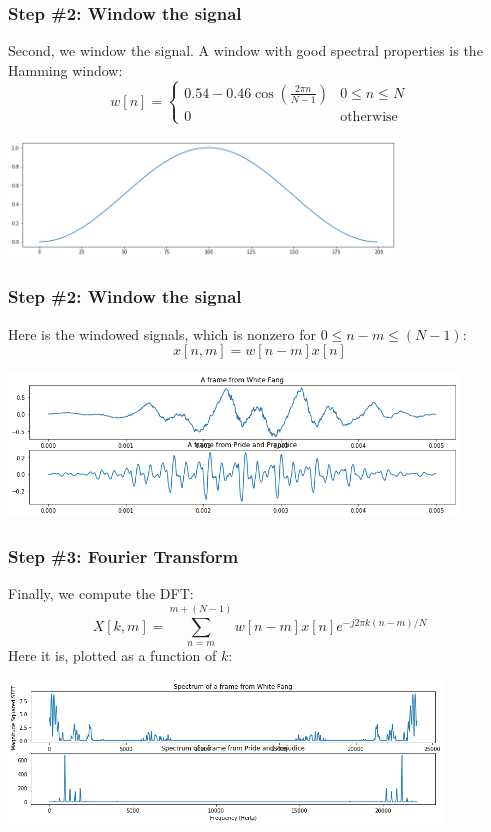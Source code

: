 \documentclass{beamer}
\begin{document}
\begin{frame}
  \frametitle{Step \#2: Window the signal}

  Second, we window the signal.  A window with good spectral
  properties is the Hamming window:
  \[
  w[n] = \begin{cases}
    0.54 - 0.46\cos\left(\frac{2\pi n}{N-1}\right) & 0\le n\le N\\
    0 & \mbox{otherwise}
    \end{cases}
  \]
  \centerline{\includegraphics[height=1.25in]{hamming.png}}
\end{frame}

\begin{frame}
  \frametitle{Step \#2: Window the signal}

  Here is the windowed signals, which is nonzero for $0\le n-m\le (N-1)$:
  \[
  x[n,m] = w[n-m]x[n]
  \]
  \centerline{\includegraphics[height=1.5in]{librivox_windowed.png}}
\end{frame}

\begin{frame}
  \frametitle{Step \#3: Fourier Transform}

  Finally, we compute the DFT:
  \[
  X[k,m] = \sum_{n=m}^{m+(N-1)} w[n-m]x[n]e^{-j2\pi k(n-m)/N} 
  \]
  Here it is, plotted as a function of $k$:
  \centerline{\includegraphics[height=1.5in]{librivox_dftsquared.png}}
\end{frame}
\end{document}
